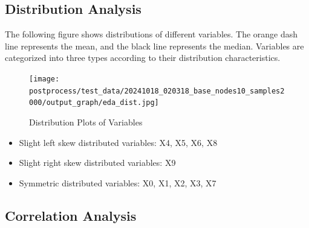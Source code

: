 \documentclass{article}
\begin{document}
\subsection{Distribution Analysis}
The following figure shows distributions of different variables. The orange dash line represents the mean, 
and the black line represents the median. Variables are categorized into three types according to their distribution characteristics.

\begin{figure}[H]
\centering
\texttt{[image: postprocess/test\_data/20241018\_020318\_base\_nodes10\_samples2000/output\_graph/eda\_dist.jpg]}
\caption{\label{fig:dist}Distribution Plots of Variables}
\end{figure}

\begin{itemize}
\item Slight left skew distributed variables: X4, X5, X6, X8
\item Slight right skew distributed variables: X9
\item Symmetric distributed variables: X0, X1, X2, X3, X7
\end{itemize}

\subsection{Correlation Analysis}
\end{document}
